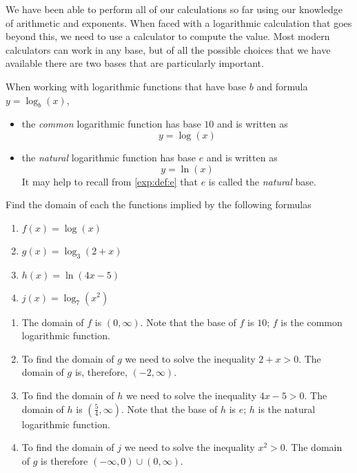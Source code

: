We have been able to perform all of our calculations so far using our knowledge of
arithmetic and exponents.  When faced with a 
logarithmic calculation that goes beyond this, we need to use a calculator
to compute the value. Most modern calculators can work in any base, 
but of all the possible choices that we have available there are  
two bases that are particularly important.

\begin{pccdefinition}
	When working with logarithmic functions that have base $b$ and formula $y=\log_b(x)$,
	\begin{itemize}
		\item the \emph{common} logarithmic function has base $10$ and is 
		written as
		\[
			y=\log(x)
		\]
		\item the \emph{natural} logarithmic function has base $e$ and is
		written as
		\[
			y=\ln(x)
		\]
		It may help to recall from \vref{exp:def:e} that $e$ is called the \emph{natural} base.
	\end{itemize}
\end{pccdefinition}
\begin{pccexample}[Domain]
	Find the domain of each the functions implied by the following formulas
	\begin{multicols}{2}
		\begin{enumerate}
			\item $f(x)=\log(x)$
			\item $g(x)=\log_3(2+x)$
			\item $h(x)=\ln(4x-5)$
			\item $j(x)=\log_7(x^2)$
		\end{enumerate}
	\end{multicols}
	\begin{pccsolution}
		\begin{enumerate}
			\item The domain of $f$ is $(0,\infty)$. Note that the base of $f$ is $10$; 
			$f$ is the common logarithmic function.
			\item To find the domain of $g$ we need to solve the inequality $2+x>0$. 
			The domain of $g$ is, therefore, $(-2,\infty)$.
			\item To find the domain of $h$ we need to solve the inequality $4x-5>0$.
			The domain of $h$ is $\left( \frac{5}{4},\infty \right)$. Note that the 
			base of $h$ is $e$; $h$ is the natural logarithmic function.
			\item To find the domain of $j$ we need to solve the inequality $x^2>0$. 
			The domain of $g$ is therefore $(-\infty,0)\cup (0,\infty)$.
		\end{enumerate}
	\end{pccsolution}
\end{pccexample}

